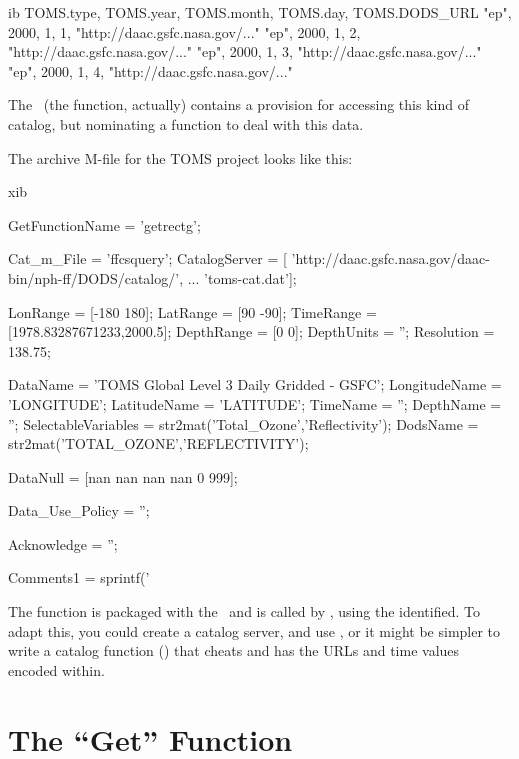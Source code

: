 \begin{vcode}{ib}
TOMS.type, TOMS.year, TOMS.month, TOMS.day, TOMS.DODS_URL
"ep", 2000, 1, 1, "http://daac.gsfc.nasa.gov/..."
"ep", 2000, 1, 2, "http://daac.gsfc.nasa.gov/..."
"ep", 2000, 1, 3, "http://daac.gsfc.nasa.gov/..."
"ep", 2000, 1, 4, "http://daac.gsfc.nasa.gov/..."
\end{vcode}

The \GUI\ (the  function, actually) contains a provision
for accessing this kind of catalog, but nominating a function to deal
with this data.

The archive M-file for the TOMS project looks like this:


\begin{vcode}{xib}

GetFunctionName = 'getrectg';

Cat_m_File = 'ffcsquery';
CatalogServer = [ 'http://daac.gsfc.nasa.gov/daac-bin/nph-ff/DODS/catalog/', ...
                'toms-cat.dat'];

LonRange = [-180 180];
LatRange = [90 -90];
TimeRange = [1978.83287671233,2000.5];
DepthRange = [0 0];
DepthUnits = '';
Resolution = 138.75;

DataName = 'TOMS Global Level 3 Daily Gridded - GSFC';
LongitudeName = 'LONGITUDE';
LatitudeName = 'LATITUDE';
TimeName = '';
DepthName = '';
SelectableVariables = str2mat('Total_Ozone','Reflectivity');
DodsName = str2mat('TOTAL_OZONE','REFLECTIVITY');

DataNull = [nan nan nan nan 0 999];

Data_Use_Policy = '';

Acknowledge = '';

Comments1 = sprintf('%
\end{vcode}

The  function is packaged with the \GUI\ and is called
by , using the  identified.  To adapt
this, you could create a catalog server, and use , or
it might be simpler to write a catalog function ()
that cheats and has the URLs and time values encoded within.

\section{The ``Get'' Function}
\label{gui,adding,get}

